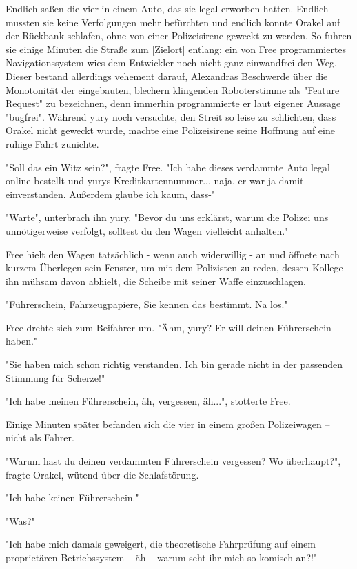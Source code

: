 Endlich saßen die vier in einem Auto, das sie legal erworben hatten. Endlich mussten sie keine Verfolgungen mehr befürchten und endlich konnte Orakel auf der Rückbank schlafen, ohne von einer Polizeisirene geweckt zu werden. So fuhren sie einige Minuten die Straße zum [Zielort] entlang; ein von Free programmiertes Navigationssystem wies dem Entwickler noch nicht ganz einwandfrei den Weg. Dieser bestand allerdings vehement darauf, Alexandras Beschwerde über die Monotonität der eingebauten, blechern klingenden Roboterstimme als "Feature Request" zu bezeichnen, denn immerhin programmierte er laut eigener Aussage "bugfrei". Während yury noch versuchte, den Streit so leise zu schlichten, dass Orakel nicht geweckt wurde, machte eine Polizeisirene seine Hoffnung auf eine ruhige Fahrt zunichte.

"Soll das ein Witz sein?", fragte Free. "Ich habe dieses verdammte Auto legal online bestellt und yurys Kreditkartennummer... naja, er war ja damit einverstanden. Außerdem glaube ich kaum, dass-"

"Warte", unterbrach ihn yury. "Bevor du uns erklärst, warum die Polizei uns unnötigerweise verfolgt, solltest du den Wagen vielleicht anhalten."

Free hielt den Wagen tatsächlich - wenn auch widerwillig - an und öffnete nach kurzem Überlegen sein Fenster, um mit dem Polizisten zu reden, dessen Kollege ihn mühsam davon abhielt, die Scheibe mit seiner Waffe einzuschlagen.

"Führerschein, Fahrzeugpapiere, Sie kennen das bestimmt. Na los."

Free drehte sich zum Beifahrer um. "Ähm, yury? Er will deinen Führerschein haben."

"Sie haben mich schon richtig verstanden. Ich bin gerade nicht in der passenden Stimmung für Scherze!"

"Ich habe meinen Führerschein, äh, vergessen, äh...", stotterte Free.

Einige Minuten später befanden sich die vier in einem großen Polizeiwagen – nicht als Fahrer.

"Warum hast du deinen verdammten Führerschein vergessen? Wo überhaupt?", fragte Orakel, wütend über die Schlafstörung.

"Ich habe keinen Führerschein."

"Was?"

"Ich habe mich damals geweigert, die theoretische Fahrprüfung auf einem proprietären Betriebssystem – äh – warum seht ihr mich so komisch an?!"


